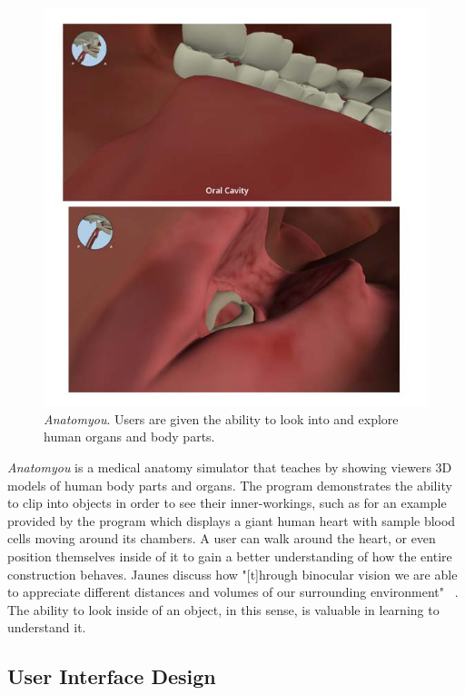 \documentclass[10pt,twocolumn,letterpaper]{article}
\begin{document}
\begin{figure}[t]
\begin{center}
\includegraphics[width=1.0\linewidth]{images/anatomyou.jpg}
\end{center}
   \caption{\textit{Anatomyou}.  Users are given the ability to look into and explore human organs and body parts. }
\label{fig:long}
\label{fig:onecol}
\end{figure}

\textit{Anatomyou} is a medical anatomy simulator that teaches by showing viewers 3D models of human body parts and organs. The program demonstrates the ability to clip into objects in order to see their inner-workings, such as for an example provided by the program which displays a giant human heart with sample blood cells moving around its chambers. A user can walk around the heart, or even position themselves inside of it to gain a better understanding of how the entire construction behaves. Jaunes \etal discuss how "[t]hrough binocular vision we are able to appreciate different distances and volumes of our surrounding environment" ~\cite{Juanes:2016:IVA:3012430.3012559}. The ability to look inside of an object, in this sense, is valuable in learning to understand it.

\subsection{User Interface Design}
\end{document}
